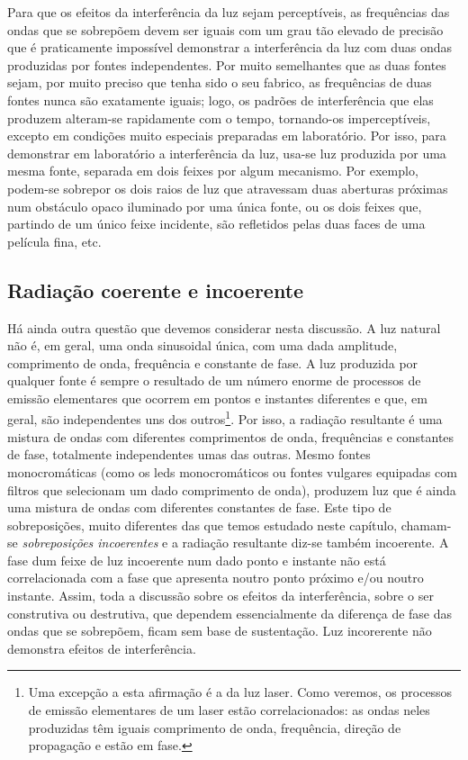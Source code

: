 Para que os efeitos da interferência da luz sejam perceptíveis, as frequências
das ondas que se sobrepõem devem ser iguais com um grau tão elevado de precisão
que é praticamente impossível demonstrar a interferência da luz com duas ondas
produzidas por fontes independentes. Por muito semelhantes que as duas fontes
sejam, por muito preciso que tenha sido o seu fabrico, as frequências de duas
fontes nunca são exatamente iguais; logo, os padrões de interferência que elas
produzem alteram-se rapidamente com o tempo, tornando-os imperceptíveis, excepto
em condições muito especiais preparadas em laboratório. 
Por isso, para demonstrar em laboratório a interferência da luz, usa-se luz
produzida por uma mesma fonte, separada em dois feixes por algum mecanismo. Por
exemplo, podem-se sobrepor os dois raios de luz que atravessam duas aberturas
próximas num obstáculo opaco iluminado por uma única fonte, ou os dois feixes
que, partindo de um único feixe incidente, são refletidos pelas duas faces de
uma película fina, etc.

\subsection{Radiação coerente e incoerente}
Há ainda outra questão que devemos considerar nesta discussão. A luz natural não
é, em geral, uma onda sinusoidal única, com uma dada amplitude, comprimento de
onda, frequência e constante de fase. A luz produzida por qualquer fonte é
sempre o resultado de um número enorme de processos de emissão elementares que
ocorrem em pontos e instantes diferentes e que, em geral, são independentes uns
dos outros\footnote{Uma excepção a esta afirmação é a da luz laser. Como
veremos, os processos de emissão elementares de um laser estão correlacionados:
as ondas neles produzidas têm iguais comprimento de onda, frequência, direção de
propagação e estão em fase.}. Por isso, a radiação
resultante é uma mistura de ondas com diferentes comprimentos de onda,
frequências e constantes de fase, totalmente independentes umas das outras.
Mesmo fontes monocromáticas (como os leds monocromáticos ou fontes vulgares
equipadas com filtros que selecionam um dado comprimento de onda), produzem luz
que é ainda uma mistura de ondas com diferentes constantes de fase. Este tipo de
sobreposições, muito diferentes das que temos estudado neste capítulo, chamam-se
\emph{sobreposições incoerentes} e a radiação resultante diz-se também
incoerente. A fase dum feixe de luz incoerente num dado ponto e instante não
está correlacionada com a fase que apresenta noutro ponto próximo e/ou noutro
instante. Assim, toda a discussão sobre os efeitos da interferência, sobre o ser
construtiva ou destrutiva, que dependem essencialmente da diferença de fase das
ondas que se sobrepõem, ficam sem base de sustentação. Luz incorerente não
demonstra efeitos de interferência.

